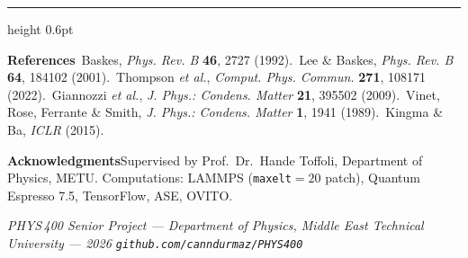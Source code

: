 \documentclass[a0,portrait]{a0poster}
\begin{document}
\vspace{0.5em}
{\color{accent}\hrule height 0.6pt}\vspace{0.45em}
{\footnotesize
\textbf{\color{accent}References}\quad
[1]~Baskes, \emph{Phys. Rev. B} \textbf{46}, 2727 (1992).\quad
[2]~Lee \& Baskes, \emph{Phys. Rev. B} \textbf{64}, 184102 (2001).\quad
[3]~Thompson \emph{et al.}, \emph{Comput. Phys. Commun.} \textbf{271}, 108171 (2022).\quad
[4]~Giannozzi \emph{et al.}, \emph{J. Phys.: Condens. Matter} \textbf{21}, 395502 (2009).\quad
[5]~Vinet, Rose, Ferrante \& Smith, \emph{J. Phys.: Condens. Matter} \textbf{1}, 1941 (1989).\quad
[6]~Kingma \& Ba, \emph{ICLR} (2015).\par
\vspace{0.2em}
\textbf{\color{accent}Acknowledgments}\quad Supervised by Prof.\ Dr.\ Hande
Toffoli, Department of Physics, METU. Computations: LAMMPS
(\texttt{maxelt}${}=20$ patch), Quantum Espresso 7.5, TensorFlow, ASE, OVITO.\par}

\vspace{0.5em}
\begin{tcolorbox}[enhanced, frame hidden, colback=accent, sharp corners,
  left=0mm, right=0mm, top=2.5mm, bottom=2.5mm, boxsep=0mm]
\centering
{\footnotesize\color{white}\itshape PHYS\,400 Senior Project --- Department of
Physics, Middle East Technical University --- 2026\qquad
\textup{\texttt{github.com/canndurmaz/PHYS400}}}
\end{tcolorbox}
\end{document}
